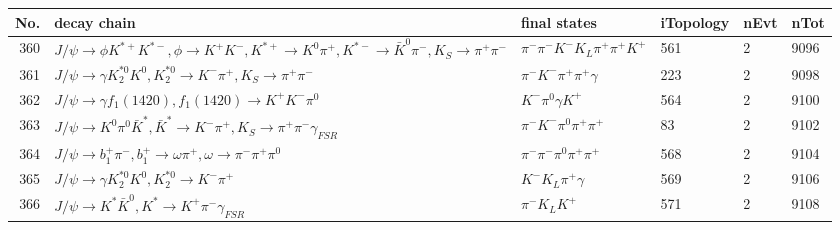 \begin{table}[htbp] 
\begin{center}
\begin{small}
\begin{tabular}{rlllll}\hline\hline
 No. & decay chain & final states &  iTopology & nEvt & nTot \\\hline
360&$J/\psi       \rightarrow \phi           K^{*+}         K^{*-}         , \phi            \rightarrow K^{+}          K^{-}          , K^{*+}          \rightarrow K^{0}          \pi^{+}        , K^{*-}          \rightarrow \bar{K}^{0}   \pi^{-}        , K_{S}           \rightarrow \pi^{+}        \pi^{-}        $&$\pi^{-}        \pi^{-}        K^{-}          K_{L}          \pi^{+}        \pi^{+}        K^{+}          $&  561&    2& 9096\\
361&$J/\psi       \rightarrow \gamma       K_2^{*0}       K^{0}          , K_2^{*0}        \rightarrow K^{-}          \pi^{+}        , K_{S}           \rightarrow \pi^{+}        \pi^{-}        $&$\pi^{-}        K^{-}          \pi^{+}        \pi^{+}        \gamma       $&  223&    2& 9098\\
362&$J/\psi       \rightarrow \gamma       f_{1}(1420)    , f_{1}(1420)     \rightarrow K^{+}          K^{-}          \pi^{0}        $&$K^{-}          \pi^{0}        \gamma       K^{+}          $&  564&    2& 9100\\
363&$J/\psi       \rightarrow K^{0}          \pi^{0}        \bar{K}^{*}   , \bar{K}^{*}    \rightarrow K^{-}          \pi^{+}        , K_{S}           \rightarrow \pi^{+}        \pi^{-}        \gamma_{FSR} $&$\pi^{-}        K^{-}          \pi^{0}        \pi^{+}        \pi^{+}        $&   83&    2& 9102\\
364&$J/\psi       \rightarrow b_{1}^{+}      \pi^{-}        , b_{1}^{+}       \rightarrow \omega         \pi^{+}        , \omega          \rightarrow \pi^{-}        \pi^{+}        \pi^{0}        $&$\pi^{-}        \pi^{-}        \pi^{0}        \pi^{+}        \pi^{+}        $&  568&    2& 9104\\
365&$J/\psi       \rightarrow \gamma       K_2^{*0}       K^{0}          , K_2^{*0}        \rightarrow K^{-}          \pi^{+}        $&$K^{-}          K_{L}          \pi^{+}        \gamma       $&  569&    2& 9106\\
366&$J/\psi       \rightarrow K^{*}          \bar{K}^{0}   , K^{*}           \rightarrow K^{+}          \pi^{-}        \gamma_{FSR} $&$\pi^{-}        K_{L}          K^{+}          $&  571&    2& 9108\\

\end{tabular}
\end{small}
\end{center}
\end{table}

